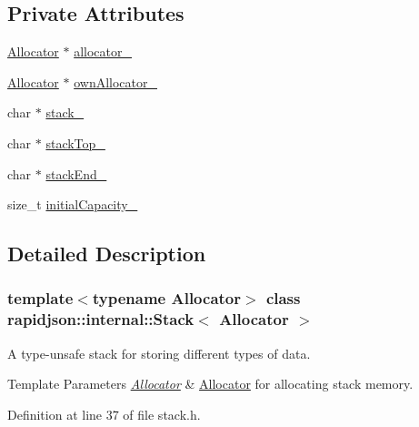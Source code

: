 \subsection*{Private Attributes}
\begin{DoxyCompactItemize}
\item 
\mbox{\hyperlink{classrapidjson_1_1_allocator}{Allocator}} $\ast$ \mbox{\hyperlink{classrapidjson_1_1internal_1_1_stack_af1b187bea41f9e60e96e0a535c489ae2}{allocator\+\_\+}}
\item 
\mbox{\hyperlink{classrapidjson_1_1_allocator}{Allocator}} $\ast$ \mbox{\hyperlink{classrapidjson_1_1internal_1_1_stack_a75a35d20a594e20698d395db04359e0c}{own\+Allocator\+\_\+}}
\item 
char $\ast$ \mbox{\hyperlink{classrapidjson_1_1internal_1_1_stack_a14335b9cd1ba0c56dfc46cce4433e2ec}{stack\+\_\+}}
\item 
char $\ast$ \mbox{\hyperlink{classrapidjson_1_1internal_1_1_stack_a954daadd0fa6ea68e84d7491311874da}{stack\+Top\+\_\+}}
\item 
char $\ast$ \mbox{\hyperlink{classrapidjson_1_1internal_1_1_stack_a79604794766876390faf0731922e9446}{stack\+End\+\_\+}}
\item 
size\+\_\+t \mbox{\hyperlink{classrapidjson_1_1internal_1_1_stack_a0f91a49432f4e0df57b8d28d7d75fe0f}{initial\+Capacity\+\_\+}}
\end{DoxyCompactItemize}


\subsection{Detailed Description}
\subsubsection*{template$<$typename Allocator$>$\newline
class rapidjson\+::internal\+::\+Stack$<$ Allocator $>$}

A type-\/unsafe stack for storing different types of data. 


\begin{DoxyTemplParams}{Template Parameters}
{\em \mbox{\hyperlink{classrapidjson_1_1_allocator}{Allocator}}} & \mbox{\hyperlink{classrapidjson_1_1_allocator}{Allocator}} for allocating stack memory. \\
\hline
\end{DoxyTemplParams}


Definition at line 37 of file stack.\+h.



